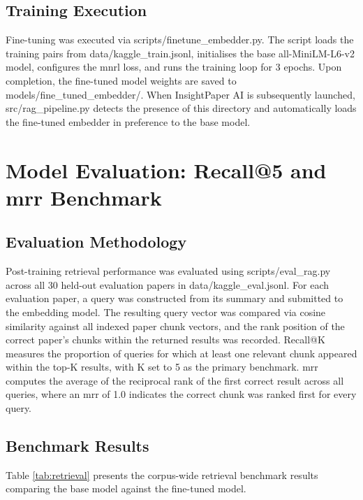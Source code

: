 \subsection{Training Execution}

Fine-tuning was executed via scripts/finetune\_embedder.py. The script loads the training pairs from data/kaggle\_train.jsonl, initialises the base all-MiniLM-L6-v2 model, configures the \gls{mnrl} loss, and runs the training loop for 3 epochs. Upon completion, the fine-tuned model weights are saved to models/fine\_tuned\_embedder/. When InsightPaper AI is subsequently launched, src/rag\_pipeline.py detects the presence of this directory and automatically loads the fine-tuned embedder in preference to the base model.

\section{Model Evaluation: Recall@5 and \gls{mrr} Benchmark}

\subsection{Evaluation Methodology}

Post-training retrieval performance was evaluated using scripts/eval\_rag.py across all 30 held-out evaluation papers in data/kaggle\_eval.jsonl. For each evaluation paper, a query was constructed from its summary and submitted to the embedding model. The resulting query vector was compared via cosine similarity against all indexed paper chunk vectors, and the rank position of the correct paper's chunks within the returned results was recorded.
\newline \newline Recall@K measures the proportion of queries for which at least one relevant chunk appeared within the top-K results, with K set to 5 as the primary benchmark. \gls{mrr} computes the average of the reciprocal rank of the first correct result across all queries, where an \gls{mrr} of 1.0 indicates the correct chunk was ranked first for every query.

\subsection{Benchmark Results}

Table \ref{tab:retrieval} presents the corpus-wide retrieval benchmark results comparing the base model against the fine-tuned model.

